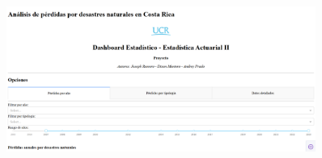 \documentclass[12pt, a4paper]{article}
\begin{document}
    \vspace{0.5cm}
\begin{figure}[htbp]
    \centering
    \includegraphics[width=0.9\textwidth]{fig/avance_dash_1/1.png}
\end{figure}

\newpage
\nocite{*}%

\end{document}
